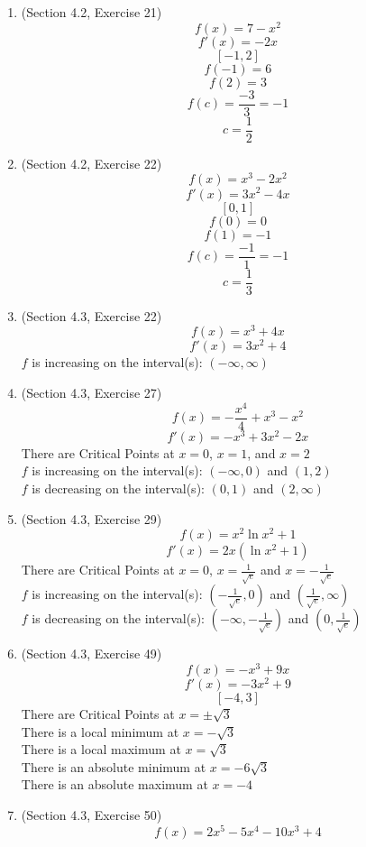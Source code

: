 \documentclass{article}
\begin{document}
\begin{enumerate}
\begin{enumerate}
        \end{enumerate}
    \item (Section 4.2, Exercise 21)
        $$f(x) = 7 - x^2$$
        $$f'(x) = -2x$$
        $$[-1, 2]$$
        $$f(-1) = 6$$
        $$f(2) = 3$$
        $$f(c) = \frac{-3}{3} = -1$$
        $$c = \frac{1}{2}$$
    \item (Section 4.2, Exercise 22)
        $$f(x) = x^3 - 2x^2$$
        $$f'(x) = 3x^2 - 4x$$
        $$[0, 1]$$
        $$f(0) = 0$$
        $$f(1) = -1$$
        $$f(c) = \frac{-1}{1} = -1$$
        $$c = \frac{1}{3}$$
    \item (Section 4.3, Exercise 22)
        $$f(x) = x^3 + 4x$$
        $$f'(x) = 3x^2 + 4$$
        $f$ is increasing on the interval(s): $(-\infty, \infty)$
    \item (Section 4.3, Exercise 27)
        $$f(x) = -\frac{x^4}{4} + x^3 - x^2$$
        $$f'(x) = -x^3 + 3x^2 - 2x$$
        There are Critical Points at $x = 0$, $x = 1$, and $x = 2$ \\
        $f$ is increasing on the interval(s): $\left(-\infty, 0\right)$ and $\left(1, 2\right)$ \\
        $f$ is decreasing on the interval(s): $\left(0, 1\right)$ and $\left(2, \infty\right)$
    \item (Section 4.3, Exercise 29)
        $$f(x) = x^2\ln{x^2} + 1$$
        $$f'(x) = 2x\left(\ln{x^2} + 1\right)$$
        There are Critical Points at $x = 0$, $x = \frac{1}{\sqrt{e}}$ and $x = -\frac{1}{\sqrt{e}}$ \\
        $f$ is increasing on the interval(s): $\left(-\frac{1}{\sqrt{e}}, 0\right)$ and $\left(\frac{1}{\sqrt{e}}, \infty\right)$ \\
        $f$ is decreasing on the interval(s): $\left(-\infty, -\frac{1}{\sqrt{e}}\right)$ and $\left(0, \frac{1}{\sqrt{e}}\right)$
    \item (Section 4.3, Exercise 49)
        $$f(x) = -x^3 + 9x$$
        $$f'(x) = -3x^2 + 9$$
        $$[-4, 3]$$
        There are Critical Points at $x = \pm \sqrt{3}$ \\
        There is a local minimum at $x = -\sqrt{3}$ \\
        There is a local maximum at $x = \sqrt{3}$ \\
        There is an absolute minimum at $x = -6\sqrt{3}$ \\
        There is an absolute maximum at $x = -4$
    \item (Section 4.3, Exercise 50)
        $$f(x) = 2x^5 - 5x^4 - 10x^3 + 4$$

\end{enumerate}
\end{document}
